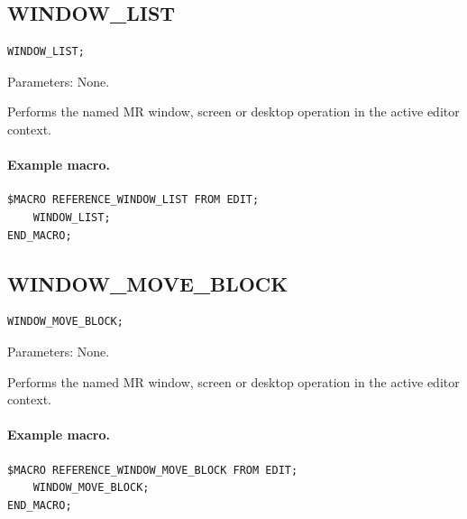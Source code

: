 \documentclass[a4paper,10pt,twoside,openany]{book}
\newenvironment{mrmacextension}{\begin{changebar}}{\end{changebar}}
\begin{document}
\begin{mrmacextension}
\label{prim:procedure-window-list}
\subsection*{WINDOW\_LIST}
\begin{verbatim}
WINDOW_LIST;
\end{verbatim}
Parameters: None.

Performs the named MR window, screen or desktop operation in the active editor context.

\paragraph{Example macro.}
\begin{verbatim}
$MACRO REFERENCE_WINDOW_LIST FROM EDIT;
    WINDOW_LIST;
END_MACRO;
\end{verbatim}
\end{mrmacextension}

\begin{mrmacextension}
\label{prim:procedure-window-move-block}
\subsection*{WINDOW\_MOVE\_BLOCK}
\begin{verbatim}
WINDOW_MOVE_BLOCK;
\end{verbatim}
Parameters: None.

Performs the named MR window, screen or desktop operation in the active editor context.

\paragraph{Example macro.}
\begin{verbatim}
$MACRO REFERENCE_WINDOW_MOVE_BLOCK FROM EDIT;
    WINDOW_MOVE_BLOCK;
END_MACRO;
\end{verbatim}
\end{mrmacextension}
\end{document}

